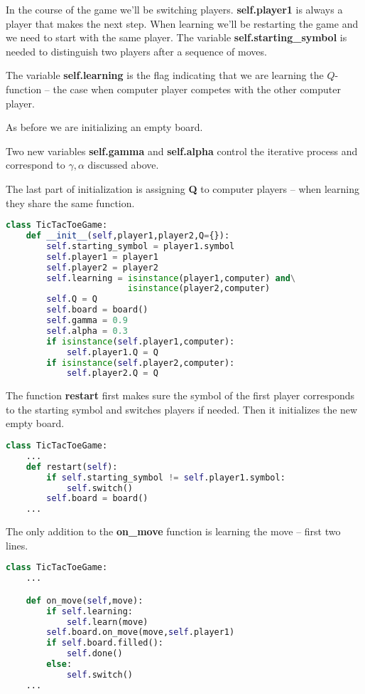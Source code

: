 In the course of the game we'll be switching players. \textbf{self.player1}
is always a player that makes the next step. When learning we'll be
restarting the game and
we need to start with the same player.
The variable \textbf{self.starting\_symbol} is needed to distinguish two
players after a sequence of moves.

The variable \textbf{self.learning} is the flag indicating that
we are learning the $Q$-function -- the case when computer player
competes with the other computer player.

As before we are initializing an empty board.

Two new variables \textbf{self.gamma} and \textbf{self.alpha} control
the iterative process and correspond to $\gamma, \alpha$ discussed
above.

The last part of initialization is assigning \textbf{Q} to
computer players -- when learning they share the same function.

\begin{lstlisting}[language=Python,style=codelst2,caption={Tic-Tac-Toe: Q-learning, game intialization}]
class TicTacToeGame:
    def __init__(self,player1,player2,Q={}):
        self.starting_symbol = player1.symbol
        self.player1 = player1
        self.player2 = player2
        self.learning = isinstance(player1,computer) and\
                        isinstance(player2,computer)
        self.Q = Q
        self.board = board()
        self.gamma = 0.9
        self.alpha = 0.3
        if isinstance(self.player1,computer): 
            self.player1.Q = Q
        if isinstance(self.player2,computer): 
            self.player2.Q = Q
\end{lstlisting}

The function \textbf{restart} first makes sure the symbol of the
first player corresponds to the starting symbol and switches players
if needed. Then it initializes the new empty board.
\begin{lstlisting}[language=Python,style=codelst2,caption={Tic-Tac-Toe: Q-learning, the game restart}]
class TicTacToeGame:
    ...
    def restart(self):
        if self.starting_symbol != self.player1.symbol:
            self.switch()
        self.board = board()
    ...
\end{lstlisting}

The only addition to the \textbf{on\_move} function is learning the
move -- first two lines.

\newpage

\begin{lstlisting}[language=Python,style=codelst2,caption={Tic-Tac-Toe: Q-learning, on move}]
class TicTacToeGame:
    ...

    def on_move(self,move):
        if self.learning:
            self.learn(move)
        self.board.on_move(move,self.player1)
        if self.board.filled():
            self.done()
        else:
            self.switch()
    ...
\end{lstlisting}

